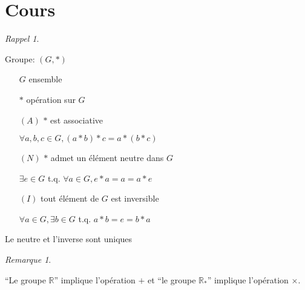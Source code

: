 \documentclass{report}
\newcounter{cours}
\newcommand*{\cours}{\section*{Cours \thecours}\stepcounter{cours}}
\newcommand*{\reels}{\mathbb{R}}
\theoremstyle{definition}
\theoremstyle{remark}
\newtheorem*{rema}{Remarque}
\newtheorem*{rappel}{Rappel}
\begin{document}
	\cours
	\begin{rappel}
		~

		\begin{ulist}[noitemsep]
			\item Groupe: $(G,*)$
			\begin{itemize}
				\item[$G$] ensemble
				\item[$*$] op\'eration sur $G$
				\item[$(A)$] $*$ est associative

				$\forall a,b,c \in G, (a*b)*c=a*(b*c)$
				\item[$(N)$] $*$ admet un \'el\'ement neutre dans $G$

				$\exists e \in G$ t.q. $\forall a \in G, e*a=a=a*e$
				\item[$(I)$] tout \'el\'ement de $G$ est inversible

				$\forall a \in G, \exists b \in G$ t.q. $a*b=e=b*a$
			\end{itemize}
			\item Le neutre et l'inverse sont uniques
		\end{ulist}
	\end{rappel}

	\begin{rema}
		~

		``Le groupe $\reels$'' implique l'op\'eration $+$ et ``le groupe $\reels_*$'' implique l'op\'eration $\times$.
	\end{rema}
\end{document}
